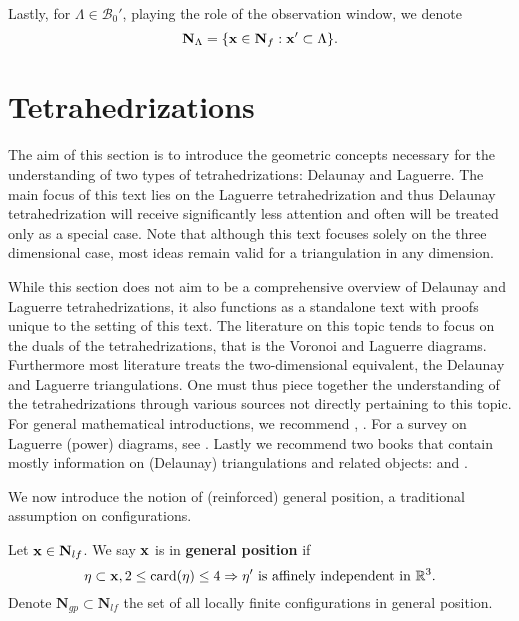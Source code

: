 Lastly, for $\Lambda \in \mathcal B_0'$, playing the role of the observation window, we denote 
$$\mathbf N_\Lambda = \{ {\mathbf{x}} \in \mathbf N_{f}: {\mathbf{x}}'\subset \Lambda\}.$$

\section{Tetrahedrizations}\label{sec:tetrahedrizations}
The aim of this section is to introduce the geometric concepts necessary for the understanding of two types of tetrahedrizations: Delaunay and Laguerre. The main focus of this text lies on the Laguerre tetrahedrization and thus Delaunay tetrahedrization will receive significantly less attention and often will be treated only as a special case. Note that although this text focuses solely on the three dimensional case, most ideas remain valid for a triangulation in any dimension.

While this section does not aim to be a comprehensive overview of Delaunay and Laguerre tetrahedrizations, it also functions as a standalone text with proofs unique to the setting of this text. The literature on this topic tends to focus on the duals of the tetrahedrizations, that is the Voronoi and Laguerre diagrams. Furthermore most literature treats the two-dimensional equivalent, the Delaunay and Laguerre triangulations. One must thus piece together the understanding of the tetrahedrizations through various sources not directly pertaining to this topic. For general mathematical introductions, we recommend \cite{Okabe1992}, \cite{Gavrilova}. For a survey on Laguerre (power) diagrams, see \cite{Aurenhammer1987}. Lastly we recommend two books that contain mostly information on (Delaunay) triangulations and related objects: \cite{Delorea2010} and \cite{Aurenhammer2013}. \newline

\noindent We now introduce the notion of (reinforced) general position, a traditional assumption on configurations.

\begin{definition}
Let ${\mathbf{x}} \in \mathbf N_{lf}$. We say ${\mathbf{x}}$ is in \textbf{general position} if 
$$ \eta \subset {\mathbf{x}}, 2 \leq \mathrm{card}(\eta) \leq 4 \Rightarrow \eta' \text{ is affinely independent in } {\mathbb R^3}. $$   
Denote $\mathbf N_{gp}\subset \mathbf N_{lf}$ the set of all locally finite configurations in general position.
\end{definition}
 
